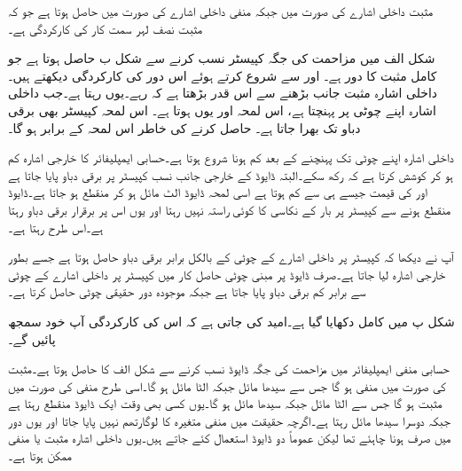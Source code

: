 مثبت داخلی اشارے کی صورت میں  جبکہ منفی داخلی اشارے کی صورت میں  حاصل ہوتا ہے جو کہ مثبت نصف لہر سمت کار کی کارکردگی ہے۔

شکل  الف میں مزاحمت کی جگہ کپیسٹر نسب کرنے سے شکل  ب حاصل ہوتا ہے جو کامل مثبت  کا دور ہے۔ اور  سے شروع کرتے ہوئے اس دور کی کارکردگی دیکھتے ہیں۔داخلی اشارہ مثبت جانب بڑھنے سے  اس قدر بڑھتا ہے کہ  رہے۔یوں  رہتا ہے۔جب داخلی اشارہ اپنے چوٹی  پر پہنچتا ہے، اس لمحہ  اور یوں  ہوتا ہے۔ اس لمحہ کپیسٹر بھی  برقی دباو تک بھرا جاتا ہے۔ حاصل کرنے کی خاطر اس لمحہ  کے برابر ہو گا۔

داخلی اشارہ اپنے چوٹی تک پہنچنے کے بعد کم ہونا شروع ہوتا ہے۔حسابی ایمپلیفائر کا خارجی اشارہ  کم ہو کر کوشش کرتا ہے کہ  رکھ سکے۔البتہ ڈایوڈ کے خارجی جانب نسب کپیسٹر پر  برقی دباو پایا جاتا ہے اور  کی قیمت جیسے ہی  سے کم ہوتا ہے اسی لمحہ ڈایوڈ الٹ مائل ہو کر منقطع ہو جاتا ہے۔ڈایوڈ منقطع ہونے سے کپیسٹر پر بار کے نکاسی  کا کوئی راستہ نہیں رہتا اور یوں اس پر برقرار  برقی دباو رہتا ہے۔اس طرح  رہتا ہے۔ 

آپ نے دیکھا کہ کپیسٹر پر داخلی اشارے کے چوٹی کے بالکل برابر برقی دباو حاصل ہوتا ہے جسے بطور خارجی اشارہ  لیا جاتا ہے۔صرف ڈایوڈ پر مبنی چوٹی حاصل کار میں کپیسٹر پر داخلی اشارے کے چوٹی سے  برابر کم برقی دباو پایا جاتا ہے جبکہ موجودہ دور حقیقی چوٹی حاصل کرتا ہے۔

شکل  پ میں کامل  دکھایا گیا ہے۔امید کی جاتی ہے کہ اس کی کارکردگی  آپ خود سمجھ پائیں گے۔

حسابی منفی ایمپلیفائر میں مزاحمت کی جگہ ڈایوڈ نسب کرنے سے شکل  الف کا  حاصل ہوتا ہے۔مثبت  کی صورت میں  منفی ہو گا جس سے  سیدھا مائل جبکہ  الٹا مائل ہو گا۔اسی طرح منفی   کی صورت میں  مثبت ہو گا جس سے  الٹا مائل جبکہ  سیدھا مائل ہو گا۔یوں کسی بھی وقت ایک ڈایوڈ منقطع رہتا ہے جبکہ دوسرا سیدھا مائل رہتا ہے۔اگرچہ حقیقت میں منفی متغیرہ کا لوگارتھم نہیں پایا جاتا اور یوں دور میں صرف  ہونا چاہئے تھا لیکن عموماً دو ڈایوڈ استعمال کئے جاتے ہیں۔یوں داخلی اشارہ  مثبت یا منفی ممکن ہوتا ہے۔

